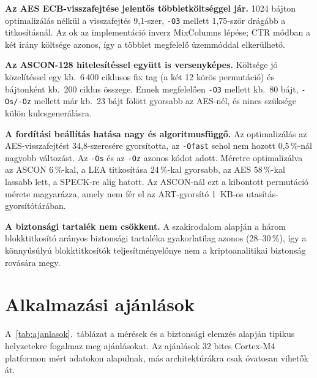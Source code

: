 \documentclass[a4paper,12pt]{report}
\theoremstyle{definition}
\theoremstyle{remark}
\begin{document}
\textbf{Az AES ECB-visszafejtése jelentős többletköltséggel jár.} 1024 bájton optimalizálás nélkül a visszafejtés 9,1-szer, \texttt{-O3} mellett 1,75-ször drágább a titkosításnál. Az ok az implementáció inverz MixColumns lépése; CTR módban a két irány költsége azonos, így a többlet megfelelő üzemmóddal elkerülhető.

\textbf{Az ASCON-128 hitelesítéssel együtt is versenyképes.} Költsége jó közelítéssel egy kb.\ 6\,400 ciklusos fix tag (a két 12 körös permutáció) és bájtonként kb.\ 200 ciklus összege. Ennek megfelelően \texttt{-O3} mellett kb.\ 80 bájt, \texttt{-Os/-Oz} mellett már kb.\ 23 bájt fölött gyorsabb az AES-nél, és nincs szüksége külön kulcsgenerálásra.

\textbf{A fordítási beállítás hatása nagy és algoritmusfüggő.} Az optimalizálás az AES-visszafejtést 34,8-szeresére gyorsította, az \texttt{-Ofast} sehol nem hozott 0,5\,\%-nál nagyobb változást. Az \texttt{-Os} és az \texttt{-Oz} azonos kódot adott. Méretre optimalizálva az ASCON 6\,\%-kal, a LEA titkosítása 24\,\%-kal gyorsabb, az AES 58\,\%-kal lassabb lett, a SPECK-re alig hatott. Az ASCON-nál ezt a kibontott permutáció mérete magyarázza, amely nem fér el az ART-gyorsító 1~KB-os utasítás-gyorsítótárában.

\textbf{A biztonsági tartalék nem csökkent.} A szakirodalom alapján a három blokktitkosító arányos biztonsági tartaléka gyakorlatilag azonos (28--30\,\%), így a könnyűsúlyú blokktitkosítók teljesítményelőnye nem a kriptoanalitikai biztonság rovására megy.

\section{Alkalmazási ajánlások}

A~\ref{tab:ajanlasok}.~táblázat a mérések és a biztonsági elemzés alapján tipikus helyzetekre fogalmaz meg ajánlásokat. Az ajánlások 32 bites Cortex-M4 platformon mért adatokon alapulnak, más architektúrákra csak óvatosan vihetők át.
\end{document}
